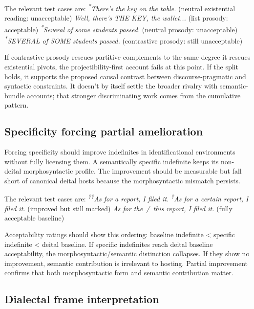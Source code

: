 \documentclass[12pt,letterpaper]{article}
\DeclareRobustCommand{\upslash}{\/\textup{~\slash~}}
\begin{document}
The relevant test cases are:
\ea
    \ea \textit{\textsuperscript{*}There's the key on the table.} (neutral existential reading: unacceptable)
    \ex \textit{Well, there's THE KEY, the wallet...} (list prosody: acceptable)
    \ex \textit{\textsuperscript{*}Several of some students passed.} (neutral prosody: unacceptable)
    \ex \textit{\textsuperscript{*}SEVERAL of SOME students passed.} (contrastive prosody: still unacceptable)
    \z
\z

\noindent If contrastive prosody rescues partitive  complements to the same degree it rescues existential pivots, the projectibility-first account fails at this point. If the split holds, it supports the proposed causal contrast between discourse-pragmatic and syntactic constraints. It doesn't by itself settle the broader rivalry with semantic-bundle accounts; that stronger discriminating work comes from the cumulative pattern.

\subsection{Specificity forcing partial amelioration}\label{sec:specific}

Forcing specificity should improve indefinites in identificational environments without fully licensing them. A semantically specific indefinite keeps its non-deital morphosyntactic profile. The improvement should be measurable but fall short of canonical deital hosts because the morphosyntactic mismatch persists.

The relevant test cases are:
\ea
    \ea \textit{\textsuperscript{??}As for a report, I filed it.}
    \ex \textit{\textsuperscript{?}As for a certain report, I filed it.} (improved but still marked)
    \ex \textit{As for the\upslash this report, I filed it.} (fully acceptable baseline)
    \z
\z

\noindent Acceptability ratings should show this ordering: baseline indefinite < specific indefinite < deital baseline. If specific indefinites reach deital baseline acceptability, the morphosyntactic/semantic distinction collapses. If they show no improvement, semantic contribution is irrelevant to hosting. Partial improvement confirms that both morphosyntactic form and semantic contribution matter.

\subsection{Dialectal frame interpretation}
\end{document}
